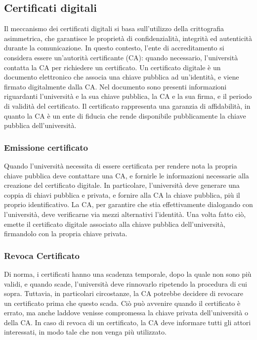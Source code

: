 \documentclass[a4paper,12pt]{article}
\begin{document}
\subsection{Certificati digitali} 
Il meccanismo dei certificati digitali si basa sull'utilizzo della crittografia asimmetrica, che garantisce le proprietà di confidenzialità, integrità ed autenticità durante la comunicazione. 
In questo contesto, l'ente di accreditamento si considera essere un'autorità certificante (CA): quando necessario, l'università contatta la CA per richiedere un certificato.
\newline
Un certificato digitale è un documento elettronico che associa una chiave pubblica ad un'identità, e viene firmato digitalmente dalla CA. Nel documento sono presenti informazioni riguardanti l'università e la sua chiave pubblica, la CA e la sua firma, e il periodo di validità del certificato. Il certificato rappresenta una garanzia di affidabilità, in quanto la CA è un ente di fiducia che rende disponibile pubblicamente la chiave pubblica dell'università.
\subsubsection{Emissione certificato} Quando l'università necessita di essere certificata per rendere nota la propria chiave pubblica deve contattare una CA, e fornirle le informazioni necessarie alla creazione del certificato digitale. In particolare, l'università deve generare una coppia di chiavi pubblica e privata, e fornire alla CA la chiave pubblica, più il proprio identificativo. La CA, per garantire che stia effettivamente dialogando con l'università, deve verificarne via mezzi alternativi l'identità. Una volta fatto ciò, emette il certificato digitale associato alla chiave pubblica dell'università, firmandolo con la propria chiave privata.
\subsubsection{Revoca Certificato} Di norma, i certificati hanno una scadenza temporale, dopo la quale non sono più validi, e quando scade, l'università deve rinnovarlo ripetendo la procedura di cui sopra. Tuttavia, in particolari circostanze, la CA potrebbe decidere di revocare un certificato prima che questo scada. Ciò può avvenire quando il certificato è errato, ma anche laddove venisse compromessa la chiave privata dell'università o della CA. In caso di revoca di un certificato, la CA deve informare tutti gli attori interessati, in modo tale che non venga più utilizzato.
\end{document}
